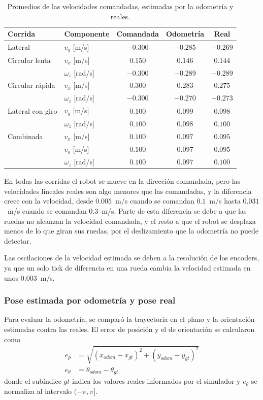 \documentclass[11pt,a4paper]{article}
\begin{document}
\begin{table}[!htbp]
\centering
\begin{tabular}{llccc}
\toprule
\textbf{Corrida} & \textbf{Componente} & \textbf{Comandada} & \textbf{Odometría} & \textbf{Real} \\
\midrule
Lateral & $v_y$ [m/s] & $-0.300$ & $-0.285$ & $-0.269$ \\
Circular lenta & $v_x$ [m/s] & $0.150$ & $0.146$ & $0.144$ \\
 & $\omega_z$ [rad/s] & $-0.300$ & $-0.289$ & $-0.289$ \\
Circular rápida & $v_x$ [m/s] & $0.300$ & $0.283$ & $0.275$ \\
 & $\omega_z$ [rad/s] & $-0.300$ & $-0.270$ & $-0.273$ \\
Lateral con giro & $v_y$ [m/s] & $0.100$ & $0.099$ & $0.098$ \\
 & $\omega_z$ [rad/s] & $0.100$ & $0.098$ & $0.100$ \\
Combinada & $v_x$ [m/s] & $0.100$ & $0.097$ & $0.095$ \\
 & $v_y$ [m/s] & $0.100$ & $0.097$ & $0.095$ \\
 & $\omega_z$ [rad/s] & $0.100$ & $0.097$ & $0.100$ \\
\bottomrule
\end{tabular}
\caption{Promedios de las velocidades comandadas, estimadas por la odometría y reales.}
\label{tab:vel_modelo}
\end{table}

En todas las corridas el robot se mueve en la dirección comandada, pero las velocidades lineales reales son algo menores que las comandadas, y la diferencia crece con la velocidad, desde $0.005$~m/s cuando se comandan $0.1$~m/s hasta $0.031$~m/s cuando se comandan $0.3$~m/s. Parte de esta diferencia se debe a que las ruedas no alcanzan la velocidad comandada, y el resto a que el robot se desplaza menos de lo que giran sus ruedas, por el deslizamiento que la odometría no puede detectar.

Las oscilaciones de la velocidad estimada se deben a la resolución de los encoders, ya que un solo tick de diferencia en una rueda cambia la velocidad estimada en unos $0.003$~m/s.

\subsubsection{Pose estimada por odometría y pose real}

Para evaluar la odometría, se comparó la trayectoria en el plano y la orientación estimadas contra las reales. El error de posición y el de orientación se calcularon como
\begin{align}
e_p &= \sqrt{(x_{odom} - x_{gt})^2 + (y_{odom} - y_{gt})^2}\\
e_\theta &= \theta_{odom} - \theta_{gt}
\end{align}
donde el subíndice $gt$ indica los valores reales informados por el simulador y $e_\theta$ se normaliza al intervalo $(-\pi, \pi]$.
\end{document}
